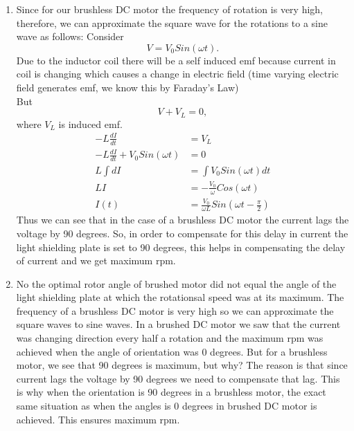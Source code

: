 \documentclass[12pt,a4paper]{report}
\begin{document}
\begin{enumerate}
\item Since for our brushless DC motor the frequency of rotation is very high, therefore, we can approximate the square wave for the rotations to a sine wave as follows:
	Consider \[V=V_0Sin(\omega t).\]
	Due to the inductor coil there will be a self induced emf because current in coil is changing which causes a change in electric field (time varying electric field generates emf, we know this by Faraday's Law)\\ But \[V+V_L=0,\] where \(V_L\) is induced emf. 
		\begin{align}
			-L \frac{dI}{dt} &= V_L\\
			-L \frac{dI}{dt} + V_0Sin(\omega t) &= 0\\
			L\int{dI}&=\int{V_0Sin(\omega t)dt}\\
			LI&=-\frac{V_0}{\omega}Cos(\omega t)\\
			I(t)&=\frac{V_0}{\omega L}Sin(\omega t-\frac{\pi}{2})
\end{align}
Thus we can see that in the case of a brushless DC motor the current lags the voltage by 90 degrees. So, in order to compensate for this
delay in current the light shielding plate is set to 90 degrees, this helps
in compensating the delay of current and we get maximum rpm.
\item No the optimal rotor angle of brushed motor did not equal the angle of the light shielding plate at which the rotationsal speed was at its maximum. 
	The frequency of a brushless DC motor is very high so we can approximate the square waves to sine waves. 
	In a brushed DC motor we saw that the current was changing direction every half a rotation and the maximum rpm was achieved when the angle of orientation was 0 degrees. 
But for a brushless motor, we see that 90 degrees is maximum, but why? The reason is that since current lags the voltage by 90 degrees we need to compensate that lag. 
This is why when the orientation is 90 degrees in a brushless motor, the exact same situation as when the angles is 0 degrees in brushed DC motor is achieved. This ensures maximum rpm. 
\end{enumerate}
\end{document}
